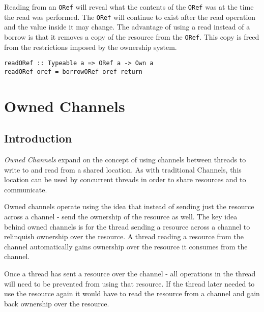 \documentclass[onehalf,11pt]{beavtex}
\begin{document}
Reading from an \texttt{ORef} will reveal what the contents of the \texttt{ORef}
was at the time the read was performed.  The \texttt{ORef} will continue to
exist after the read operation and the value inside it may change.
The advantage of using a read instead of a borrow is that it removes a copy of
the resource from the \texttt{ORef}. This copy is freed from the restrictions
imposed by the ownership system.

\begin{verbatim}
readORef :: Typeable a => ORef a -> Own a
readORef oref = borrowORef oref return
\end{verbatim}





\chapter{Owned Channels}

\section{Introduction}

\textit{Owned Channels} expand on the concept of using channels between threads
to write to and read from a shared location.   As with traditional Channels,
this location can be used by concurrent threads in order to share resources and
to communicate.


Owned channels operate using the idea that instead of sending just the
resource across a channel - send the ownership of the resource as well.
The key idea behind owned channels is for the thread sending a
resource across a channel to relinquish ownership over the resource.
A thread reading a resource from the channel automatically gains ownership over
the resource it consumes from the channel.

Once a thread has sent a resource over the channel - all operations in the thread
will need to be prevented from using that resource.
If the thread later needed to use the resource again it would have to read the
resource from a channel and gain back ownership over the resource.
\end{document}
